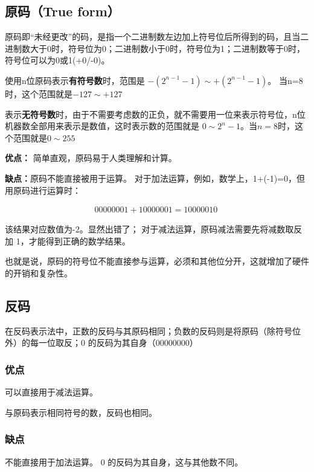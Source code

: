 \begin{issues}
\issueDraft
\end{issues}


\subsection{原码（True form）}

原码即“未经更改”的码，是指一个二进制数左边加上符号位后所得到的码，且当二进制数大于0时，符号位为0；二进制数小于0时，符号位为1；二进制数等于0时，符号位可以为0或1(+0/-0)。

使用n位原码表示\textbf{有符号数}时，范围是 $-(2^{n-1}-1)\sim +(2^{n-1}-1)$。 当n=8时，这个范围就是$-127\sim +127 $

表示\textbf{无符号数}时，由于不需要考虑数的正负，就不需要用一位来表示符号位，n位机器数全部用来表示是数值，这时表示数的范围就是
$0\sim 2^{n}-1$。当$n=8$时，这个范围就是$0\sim 255$


\textbf{优点：}
简单直观，原码易于人类理解和计算。

\textbf{缺点：}原码不能直接被用于运算。
对于加法运算，例如，数学上，1+(-1)=0，但用原码进行运算时：


\begin{align}
00000001+10000001=10000010~
\end{align}


该结果对应数值为-2。显然出错了；
对于减法运算，原码减法需要先将减数取反加 1，才能得到正确的数学结果。

也就是说，原码的符号位不能直接参与运算，必须和其他位分开，这就增加了硬件的开销和复杂性。

\subsection{反码}
在反码表示法中，正数的反码与其原码相同；负数的反码则是将原码（除符号位外）的每一位取反；0 的反码为其自身（00000000）

\subsubsection{优点}
可以直接用于减法运算。

与原码表示相同符号的数，反码也相同。

\subsubsection{缺点}
不能直接用于加法运算。
0 的反码为其自身，这与其他数不同。


